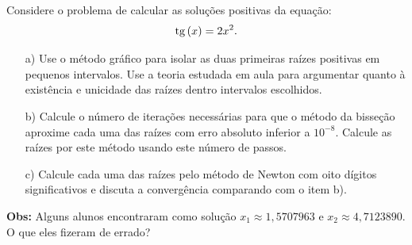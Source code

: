 \begin{Exercise} Considere o problema de calcular as soluções positivas da equação:
  \begin{equation*}
    \operatorname{tg}\,(x)=2x^2.    
  \end{equation*}
\begin{itemize}
\item[a)] Use o método gráfico para isolar as duas primeiras raízes positivas em pequenos intervalos. Use a teoria estudada em aula para argumentar quanto à existência e unicidade das raízes dentro intervalos escolhidos.
\item[b)] Calcule o número de iterações necessárias para que o método da bisseção aproxime cada uma das raízes com erro absoluto inferior a $10^{-8}$. Calcule as raízes por este método usando este número de passos.
\item[c)]  Calcule cada uma das raízes pelo método de Newton com oito dígitos significativos e discuta a convergência comparando com o item b).
\end{itemize}
{\bf Obs:} Alguns alunos encontraram como solução $x_1\approx 1,5707963$ e $x_2 \approx 4,7123890$. O que eles fizeram de errado?
\end{Exercise}
\ifisscilab
